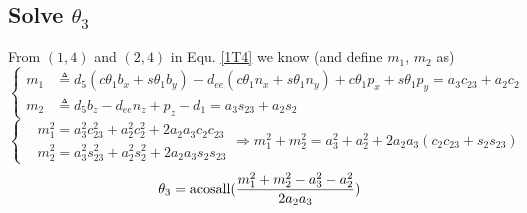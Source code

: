 \documentclass[utf8]{article}
\begin{document}
\subsection{Solve $\theta_3$ }
From $(1, 4)$ and $(2, 4)$ in Equ. \ref{1T4} we know (and define $m_1$, $m_2$ as)
\begin{equation}\label{check23}
\left\{
\begin{aligned}
m_1 &\triangleq d_5(c\theta_1b_x + s\theta_1b_y) - d_{ee}(c\theta_1n_x + s\theta_1n_y) + c\theta_1p_x + s\theta_1p_y = a_3c_{23}+ a_2c_2\\
m_2 &\triangleq d_5b_z - d_{ee}n_z + p_z - d_1 = a_3s_{23}+ a_2s_2
\end{aligned}
\right.
\end{equation}
$$\left\{
\begin{aligned}
&m_1^2 = a_3^2c_{23}^2 + a_2^2c_2^2 + 2a_2a_3c_2c_{23}\\
&m_2^2 = a_3^2s_{23}^2 + a_2^2s_2^2 + 2a_2a_3s_2s_{23}
\end{aligned}
\right.\Rightarrow m_1^2 + m_2^2 = a_3^2 + a_2^2 + 2a_2a_3(c_2c_{23} + s_2s_{23})
$$
\begin{equation}
\theta_3 = {\rm acosall}(\frac{m_1^2 + m_2^2 - a_3^2 - a_2^2}{2a_2a_3})
\end{equation}
\end{document}
